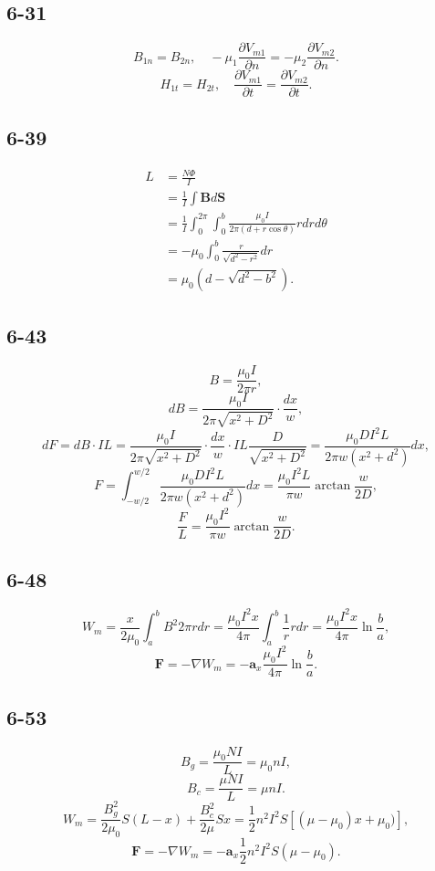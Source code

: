 \documentclass[11pt,a4paper]{article}
\begin{document}
\subsection{6-31}
$$B_{1n}=B_{2n},\quad -\mu_1\frac{\partial V_{m1}}{\partial n}=-\mu_2\frac{\partial V_{m2}}{\partial n}.$$
$$H_{1t}=H_{2t},\quad \frac{\partial V_{m1}}{\partial t}=\frac{\partial V_{m2}}{\partial t}.$$

\subsection{6-39}
\begin{align*}
L&=\frac{N\Phi}{I}\\&=\frac{1}{I}\int\mathbf{B}d\mathbf{S}\\&=\frac{1}{I}\int_0^{2\pi}\int_0^b\frac{\mu_0I}{2\pi(d+r\cos\theta)}rdrd\theta\\&=-\mu_0\int_0^b\frac{r}{\sqrt{d^2-r^2}}dr\\&=\mu_0(d-\sqrt{d^2-b^2}).
\end{align*}

\subsection{6-43}
$$B=\frac{\mu_0I}{2\pi r},$$
$$dB=\frac{\mu_0I}{2\pi \sqrt{x^2+D^2}}\cdot\frac{dx}{w},$$
$$dF=dB\cdot IL=\frac{\mu_0I}{2\pi \sqrt{x^2+D^2}}\cdot\frac{dx}{w}\cdot IL\frac{D}{\sqrt{x^2+D^2}}=\frac{\mu_0DI^2L}{2\pi w(x^2+d^2)}dx,$$
$$F=\int_{-w/2}^{w/2}\frac{\mu_0DI^2L}{2\pi w(x^2+d^2)}dx=\frac{\mu_0I^2L}{\pi w}\arctan\frac{w}{2D},$$
$$\frac{F}{L}=\frac{\mu_0I^2}{\pi w}\arctan\frac{w}{2D}.$$

\subsection{6-48}
$$W_m=\frac{x}{2\mu_0}\int_a^bB^2 2\pi rdr=\frac{\mu_0I^2x}{4\pi}\int_a^b\frac{1}{r}rdr=\frac{\mu_0I^2x}{4\pi}\ln\frac{b}{a},$$
$$\mathbf{F}=-\nabla W_m=-\mathbf{a}_x\frac{\mu_0I^2}{4\pi}\ln\frac{b}{a}.$$

\subsection{6-53}
$$B_g=\frac{\mu_0 NI}{L}=\mu_0 nI,$$
$$B_c=\frac{\mu NI}{L}=\mu nI.$$
$$W_m=\frac{B_g^2}{2\mu_0}S(L-x)+\frac{B_c^2}{2\mu}Sx=\frac{1}{2}n^2I^2S[(\mu-\mu_0)x+\mu_0)],$$
$$\mathbf{F}=-\nabla W_m=-\mathbf{a}_x\frac{1}{2}n^2I^2S(\mu-\mu_0).$$
\end{document}
